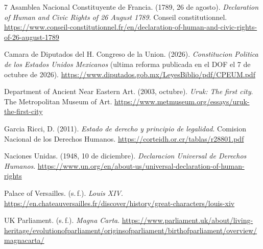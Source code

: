 \documentclass[spanish,letterpaper,oneside]{article}
\begin{document}
\clearpage
\begin{thebibliography}{7}
Asamblea Nacional Constituyente de Francia. (1789, 26 de agosto).
\emph{Declaration of Human and Civic Rights of 26 August 1789}.
Conseil constitutionnel.
\url{https://www.conseil-constitutionnel.fr/en/declaration-of-human-and-civic-rights-of-26-august-1789}

Camara de Diputados del H. Congreso de la Union. (2026).
\emph{Constitucion Politica de los Estados Unidos Mexicanos}
(ultima reforma publicada en el DOF el 7 de octubre de 2026).
\url{https://www.diputados.gob.mx/LeyesBiblio/pdf/CPEUM.pdf}

Department of Ancient Near Eastern Art. (2003, octubre).
\emph{Uruk: The first city}. The Metropolitan Museum of Art.
\url{https://www.metmuseum.org/essays/uruk-the-first-city}

Garcia Ricci, D. (2011). \emph{Estado de derecho y principio de legalidad}.
Comision Nacional de los Derechos Humanos.
\url{https://corteidh.or.cr/tablas/r28801.pdf}

Naciones Unidas. (1948, 10 de diciembre).
\emph{Declaracion Universal de Derechos Humanos}.
\url{https://www.un.org/en/about-us/universal-declaration-of-human-rights}

Palace of Versailles. (s.\,f.). \emph{Louis XIV}.
\url{https://en.chateauversailles.fr/discover/history/great-characters/louis-xiv}

UK Parliament. (s.\,f.). \emph{Magna Carta}.
\url{https://www.parliament.uk/about/living-heritage/evolutionofparliament/originsofparliament/birthofparliament/overview/magnacarta/}
\end{thebibliography}
\end{document}
